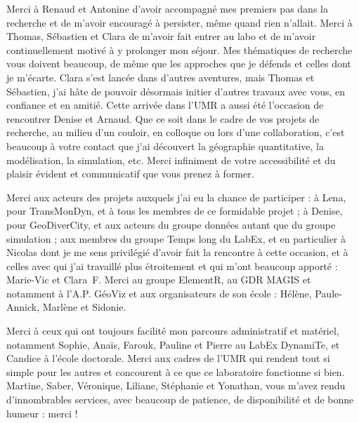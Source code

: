 Merci à Renaud et Antonine d'avoir accompagné mes premiers pas dans la recherche et de m'avoir encouragé à persister, même quand rien n'allait.
Merci à Thomas, Sébastien et Clara de m'avoir fait entrer au labo et de m'avoir continuellement motivé à y prolonger mon séjour.
Mes thématiques de recherche vous doivent beaucoup, de même que les approches que je défends et celles dont je m'écarte.
Clara s'est lancée dans d'autres aventures, mais Thomas et Sébastien, j'ai hâte de pouvoir désormais initier d'autres travaux avec vous, en confiance et en amitié.
Cette arrivée dans l'UMR a aussi été l'occasion de rencontrer Denise et Arnaud.
Que ce soit dans le cadre de vos projets de recherche, au milieu d'un couloir, en colloque ou lors d'une collaboration, c'est beaucoup à votre contact que j'ai découvert la géographie quantitative, la modélisation, la simulation, etc.
Merci infiniment de votre accessibilité et du plaisir évident et communicatif que vous prenez à former.
\clearpage

Merci aux acteurs des projets auxquels j'ai eu la chance de participer : 
à Lena, pour TransMonDyn, et à tous les membres de ce formidable projet ; à Denise, pour GeoDiverCity, et aux acteurs du groupe \og données\fg{} autant que du groupe \og simulation\fg{} ; aux membres du groupe \og Temps long\fg{} du LabEx, et en particulier à Nicolas dont je me sens privilégié d'avoir fait la rencontre à cette occasion, et à celles avec qui j'ai travaillé plus étroitement et qui m'ont beaucoup apporté : Marie-Vic et Clara~F.
Merci au groupe ElementR, au GDR MAGIS et notamment à l'A.P. GéoViz et aux organisateurs de son école : Hélène, Paule-Annick, Marlène et Sidonie.

Merci à ceux qui ont toujours facilité mon parcours administratif et matériel, notamment Sophie, Anaïs, Farouk, Pauline et Pierre au LabEx DynamiTe, et Candice à l'école doctorale.
Merci aux \og cadres\fg{} de l'UMR qui rendent tout si simple pour les autres et concourent à ce que ce laboratoire fonctionne si bien.
Martine, Saber, Véronique, Liliane, Stéphanie et Yonathan, vous m'avez rendu d'innombrables services, avec beaucoup de patience, de disponibilité et de bonne humeur : merci !

